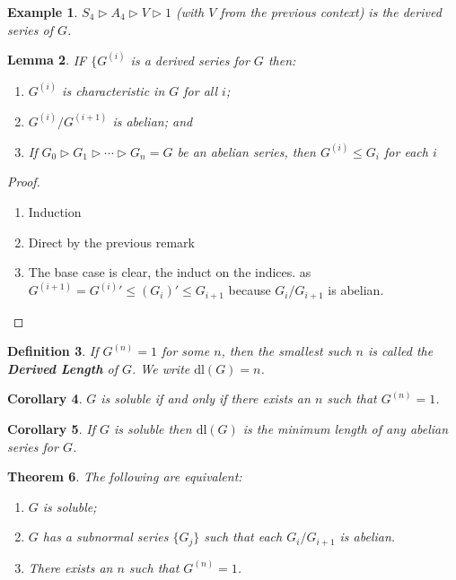 \documentclass[a4paper,10pt]{article}
\newtheorem{thm}{Theorem}
\newtheorem{Def}[thm]{Definition}
\newtheorem{Cor}[thm]{Corollary}
\newtheorem{eg}[thm]{Example}
\newtheorem{Lem}[thm]{Lemma}
\begin{document}
\begin{eg}
$S_4 \triangleright A_4 \triangleright V \triangleright 1$ (with $V$ from the previous context) is the derived series of $G$. 
\end{eg}

\begin{Lem}
IF $\{ G^{(i)}$ is a derived series for $G$ then:
\begin{enumerate}
\item $G^{(i)}$ is characteristic in $G$ for all $i$;
\item $G^{(i)} / G^{(i+1)}$ is abelian; and
\item If $G_0 \triangleright G_1 \triangleright \cdots \triangleright G_n = G$ be an abelian series, then $G^{(i)} \leq G_i$ for each $i$
\end{enumerate}
\end{Lem}

\begin{proof}
\begin{enumerate}
\item Induction
\item Direct by the previous remark
\item The base case is clear, the induct on the indices. as $G^{(i+1)} = G^{(i)}{}' \leq (G_{i})' \leq G_{i+1}$ because $G_{i} / G_{i+1}$ is abelian.
\end{enumerate}
\end{proof}

\begin{Def}
If $G^{(n)} = 1$ for some $n$, then the smallest such $n$ is called the \textbf{Derived Length} of $G$. We write $\text{dl}(G) = n$. 
\end{Def}

\begin{Cor}
$G$ is soluble if and only if there exists an $n$ such that $G^{(n)} = 1$. 
\end{Cor}

\begin{Cor}
If $G$ is soluble then $\text{dl}(G)$ is the minimum length of any abelian series for $G$. 
\end{Cor}

\begin{thm}
The following are equivalent:
\begin{enumerate}
\item $G$ is soluble;
\item $G$ has a subnormal series $\{G_j\}$ such that each $G_i / G_{i+1}$ is abelian.
\item There exists an $n$ such that $G^{(n)} = 1$. 
\end{enumerate}

\end{thm}
\end{document}
